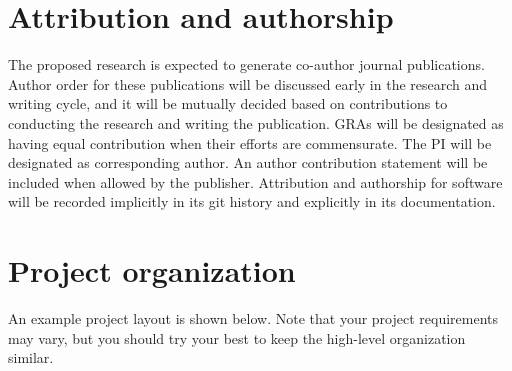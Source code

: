 \documentclass{article}
\begin{document}
\section{Attribution and authorship}
The proposed research is expected to generate co-author journal publications. Author order for
these publications will be discussed early in the research and writing cycle, and it will be mutually
decided based on contributions to conducting the research and writing the publication. GRAs will
be designated as having equal contribution when their efforts are commensurate. The PI will be
designated as corresponding author. An author contribution statement will be included when
allowed by the publisher. Attribution and authorship for software will be recorded implicitly in its
git history and explicitly in its documentation.

\section{Project organization}
An example project layout is shown below. Note that your project requirements may vary, but you
should try your best to keep the high-level organization similar.
\end{document}
